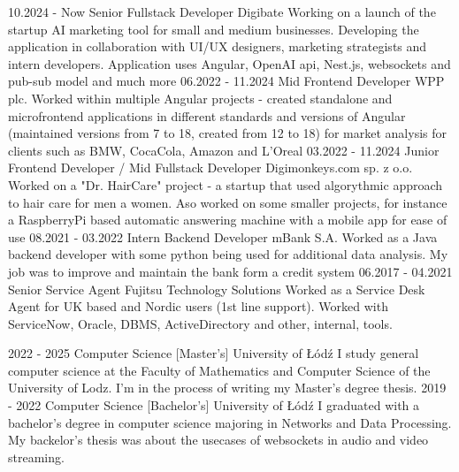 \documentclass[9pt]{developercv}%
\begin{document}
\begin{entrylist}
	\entry
		{10.2024 - Now}
		{Senior Fullstack Developer}
		{Digibate}
		{Working on a launch of the startup AI marketing tool for small and medium businesses. Developing the application in collaboration with UI/UX designers, marketing strategists and intern developers. Application uses Angular, OpenAI api, Nest.js, websockets and pub-sub model and much more}
	\entry
		{06.2022 - 11.2024}
		{Mid Frontend Developer}
		{WPP plc.}
		{Worked within multiple Angular projects - created standalone and microfrontend applications in different standards and versions of Angular (maintained versions from 7 to 18, created from 12 to 18) for market analysis for clients such as BMW, CocaCola, Amazon and L'Oreal}
	\entry
		{03.2022 - 11.2024}
		{Junior Frontend Developer / Mid Fullstack Developer}
		{Digimonkeys.com sp. z o.o.}
		{Worked on a "Dr. HairCare" project - a startup that used algorythmic approach to hair care for men a women. Aso worked on some smaller projects, for instance a RaspberryPi based automatic answering machine with a mobile app for ease of use}
	\entry
		{08.2021 - 03.2022}
		{Intern Backend Developer}
		{mBank S.A.}
		{Worked as a Java backend developer with some python being used for additional data analysis. My job was to improve and maintain the bank form a credit system}  	
	\entry
		{06.2017 - 04.2021}
		{Senior Service Agent}
		{Fujitsu Technology Solutions}
		{Worked as a Service Desk Agent for UK based and Nordic users (1st line support). Worked with ServiceNow, Oracle, DBMS, ActiveDirectory and other, internal, tools.}
\end{entrylist}

\clearpage


\begin{entrylist}
	\entry
		{2022 - 2025}
		{Computer Science [Master's]}
		{University of Łódź}
		{I study general computer science at the Faculty of Mathematics and Computer Science of the University of Lodz. I'm in the process of writing my Master's degree thesis.}
	\entry
		{2019 - 2022}
		{Computer Science [Bachelor's]}
		{University of Łódź}
		{I graduated with a bachelor's degree in computer science majoring in Networks and Data Processing. My backelor's thesis was about the usecases of websockets in audio and video streaming.}
\end{entrylist}
\end{document}
